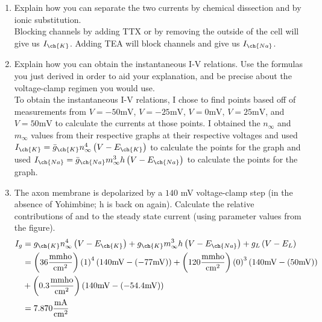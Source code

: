 \documentclass[11pt]{article}
\begin{document}
\begin{enumerate}[label=\arabic*.]
\begin{enumerate}[label=(\alph*)]
\begin{enumerate}[label=(\roman*)]
\item
Explain how you can separate the two currents by chemical dissection and by ionic substitution.
\vspace*{1\baselineskip}
\\
Blocking  channels by adding TTX or by removing the  outside of the cell will give us $I_{\ch{K}}$. Adding TEA will block  channels and give us $I_{\ch{Na}}$.



\item
Explain how you can obtain the instantaneous I-V relations. Use the formulas you just derived in order to aid your explanation, and be precise about the voltage-clamp regimen you would use.
\vspace*{1\baselineskip}
\\
To obtain the instantaneous I-V relations, I chose to find points based off of measurements from $V = -50 \text{mV}$, $V = -25 \text{mV}$, $V = 0 \text{mV}$, $V = 25 \text{mV}$, and $V = 50 \text{mV}$ to calculate the currents at those points. I obtained the $n_{\infty}$ and $m_{\infty}$ values from their respective graphs at their respective voltages and used $I_{\ch{K}} = \bar{g}_{\ch{K}} n_{\infty}^4 \left(V - E_{\ch{K}}\right)$ to calculate the points for the  graph and used $I_{\ch{Na}} = \bar{g}_{\ch{Na}} m_{\infty}^3 h \left(V - E_{\ch{Na}}\right)$ to calculate the points for the  graph.



\item
The axon membrane is depolarized by a $140$ mV voltage-clamp step (in the absence of Yohimbine; h is back on again). Calculate the relative contributions of  and  to the steady state current (using parameter values from the figure).
\begin{align*}
I_g &= g_{\ch{K}} n_{\infty}^4 \left(V - E_{\ch{K}}\right) + g_{\ch{K}} m_{\infty}^3 h \left(V - E_{\ch{Na}}\right) + g_L \left(V - E_L\right) \\
 &= \left(36 \frac{\text{mmho}} {\text{cm}^2}\right) \left(1\right)^4 \left(140 \text{mV} - (-77 \text{mV})\right) + \left(120 \frac{\text{mmho}} {\text{cm}^2}\right) \left(0\right)^3 \left(140 \text{mV} - (50 \text{mV})\right) \\ &+ \left(0.3 \frac{\text{mmho}} {\text{cm}^2}\right) \left(140 \text{mV} - (-54.4 \text{mV})\right) \\
 &= 7.870 \frac{\text{mA}} {\text{cm}^2}
\end{align*}




\end{enumerate}
\end{enumerate}
\end{enumerate}
\end{document}
